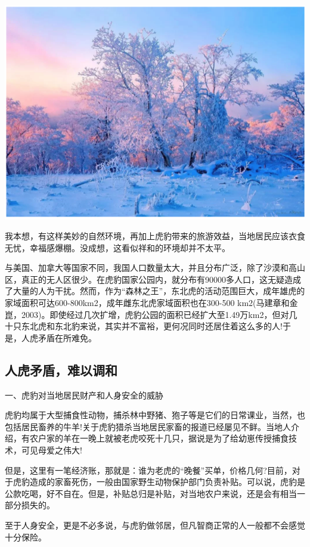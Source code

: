 \documentclass[]{book}
\begin{document}
\includegraphics[width=8.33in]{images/tiger3}

我本想，有这样美妙的自然环境，再加上虎豹带来的旅游效益，当地居民应该衣食无忧，幸福感爆棚。没成想，这看似祥和的环境却并不太平。

与美国、加拿大等国家不同，我国人口数量太大，并且分布广泛，除了沙漠和高山区，真正的无人区很少。在虎豹国家公园内，就分布有90000多人口，这无疑造成了大量的人为干扰。然而，作为``森林之王''，东北虎的活动范围巨大，成年雄虎的家域面积可达600-800km2，成年雌东北虎家域面积也在300-500
km2(马建章和金崑，2003)。即使经过几次扩增，虎豹公园的面积已经扩大至1.49万km2，但对几十只东北虎和东北豹来说，其实并不富裕，更何况同时还居住着这么多的人!于是，人虎矛盾在所难免。

\subsection{人虎矛盾，难以调和}

一、虎豹对当地居民财产和人身安全的威胁

虎豹均属于大型捕食性动物，捕杀林中野猪、狍子等是它们的日常课业，当然，也包括居民畜养的牛羊!关于虎豹猎杀当地居民家畜的报道已经屡见不鲜。当地人介绍，有农户家的羊在一晚上就被老虎咬死十几只，据说是为了给幼崽传授捕食技术，可见母爱之伟大!

但是，这里有一笔经济账，那就是：谁为老虎的``晚餐''买单，价格几何?目前，对于虎豹造成的家畜死伤，一般由国家野生动物保护部门负责补贴。可以说，虎豹是公款吃喝，好不自在。但是，补贴总归是补贴，对当地农户来说，还是会有相当一部分损失的。

至于人身安全，更是不必多说，与虎豹做邻居，但凡智商正常的人一般都不会感觉十分保险。
\end{document}
